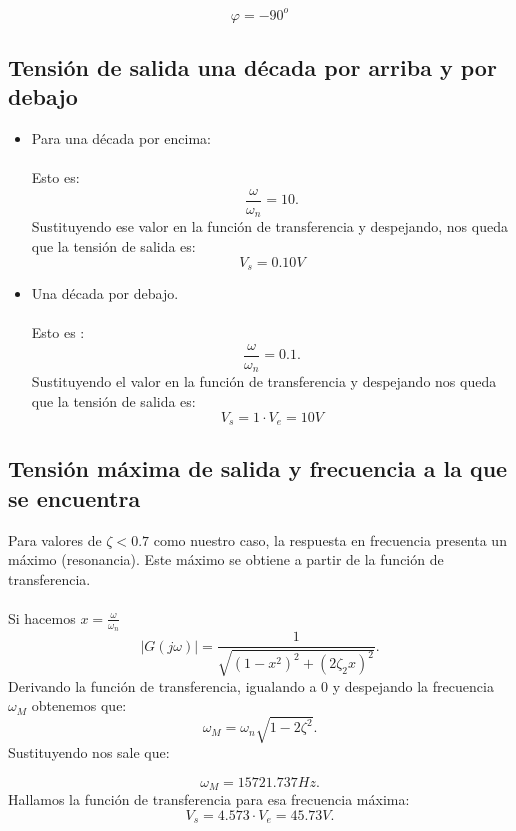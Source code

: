\documentclass[11pt,letterpaper]{article}
\begin{document}
\begin{equation}
	\boxed{\varphi=-90^o}
\end{equation}

\subsection{Tensión de salida una década por arriba y por debajo}
\begin{itemize}
	\item Para una década por encima:\\
\\
Esto es: 
\[
\frac{\omega}{\omega_n}=10
.\] 
Sustituyendo ese valor en la función de transferencia y despejando, nos queda que la tensión de salida es:
\begin{equation}
	\boxed{V_s=0.10 V}
\end{equation}

\item Una década por debajo.\\
\\
Esto es :
\[
\frac{\omega}{\omega_n}=0.1
.\] 
Sustituyendo el valor en la función de transferencia y despejando nos queda que la tensión de salida es:
\begin{equation}
    \boxed{V_s=1 \cdot V_e= 10 V}
\end{equation}
\end{itemize}
\subsection{Tensión máxima de salida y frecuencia a la que se encuentra}
Para valores de $\zeta < 0.7$ como nuestro caso, la respuesta en frecuencia  presenta un máximo (resonancia). Este máximo se obtiene a partir de la función de transferencia.\\
\\
Si hacemos $x=\frac{\omega}{\omega_n}$ 
\[
    \mid G\left( j\omega \right)  \mid =\frac{1}{\sqrt{\left( 1-x^2 \right) ^2 +\left( 2\zeta_2x \right)^2}}
.\] 
Derivando la función de transferencia, igualando a 0 y despejando la frecuencia $\omega_M$ obtenemos que:
\[
\omega_M=\omega_n\sqrt{1-2\zeta^2} 
.\] 
Sustituyendo nos sale que:

\[
\omega_M= 15721.737 Hz
.\] 
Hallamos la función de transferencia para esa frecuencia máxima:
\[
V_s=4.573 \cdot  V_e= 45.73 V
.\] 
\end{document}
